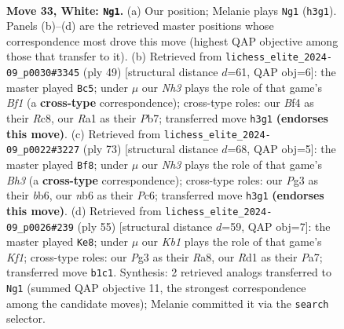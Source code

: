 \documentclass[11pt]{article}
\begin{document}
\clearpage

\begin{figure}[p]\centering
\begin{subfigure}{0.46\textwidth}\centering
\resizebox{\linewidth}{!}{%
\newchessgame
\chessboard[
  setfen={5r2/r7/pnB1bkp1/p4p1p/5B2/P4PPN/1P5P/RK1R4 w - - 2 33},
  showmover=false,
  pgfstyle=straightmove, color=movearrow, markmove={h3-g1}
]}
\caption{}
\end{subfigure}\hfill
\begin{subfigure}{0.46\textwidth}\centering
\resizebox{\linewidth}{!}{%
\newchessgame
\chessboard[
  setfen={2r2bk1/1p3p1p/5np1/1N6/2p5/2P1B2P/PP3PP1/3R2K1 b - - 6 25},
  showmover=false,
  pgfstyle=straightmove, color=movearrow, markmove={f8-c5}
]}
\caption{}
\end{subfigure}
\\[4pt]
\begin{subfigure}{0.46\textwidth}\centering
\resizebox{\linewidth}{!}{%
\newchessgame
\chessboard[
  setfen={4r1k1/1p3p1p/pBp1b1pb/2P1P3/4PP2/5NP1/1P3K1P/3R4 b - - 2 37},
  showmover=false,
  pgfstyle=straightmove, color=movearrow, markmove={h6-f8}
]}
\caption{}
\end{subfigure}\hfill
\begin{subfigure}{0.46\textwidth}\centering
\resizebox{\linewidth}{!}{%
\newchessgame
\chessboard[
  setfen={r4k2/p3bp1p/1p1p2p1/n7/3P1P2/2P1K1P1/PB1N3P/4R3 b - - 3 28},
  showmover=false,
  pgfstyle=straightmove, color=movearrow, markmove={f8-e8}
]}
\caption{}
\end{subfigure}
\caption{\textbf{Move 33, White: \texttt{Ng1}.} (a) Our position; Melanie plays \texttt{Ng1} (\texttt{h3g1}). Panels (b)--(d) are the retrieved master positions whose correspondence most drove this move (highest QAP objective among those that transfer to it). (b) Retrieved from \texttt{lichess\_elite\_2024-09\_p0030\#3345} (ply 49) [structural distance $d$=61, QAP obj=6]: the master played \texttt{Bc5}; under $\mu$ our \emph{Nh3} plays the role of that game's \emph{Bf1} (a \textbf{cross-type} correspondence); cross-type roles: our \emph{B}f4 as their \emph{R}c8, our \emph{R}a1 as their \emph{P}b7; transferred move \texttt{h3g1} \textbf{(endorses this move)}. (c) Retrieved from \texttt{lichess\_elite\_2024-09\_p0022\#3227} (ply 73) [structural distance $d$=68, QAP obj=5]: the master played \texttt{Bf8}; under $\mu$ our \emph{Nh3} plays the role of that game's \emph{Bh3} (a \textbf{cross-type} correspondence); cross-type roles: our \emph{P}g3 as their \emph{b}b6, our \emph{n}b6 as their \emph{P}c6; transferred move \texttt{h3g1} \textbf{(endorses this move)}. (d) Retrieved from \texttt{lichess\_elite\_2024-09\_p0026\#239} (ply 55) [structural distance $d$=59, QAP obj=7]: the master played \texttt{Ke8}; under $\mu$ our \emph{Kb1} plays the role of that game's \emph{Kf1}; cross-type roles: our \emph{P}g3 as their \emph{R}a8, our \emph{R}d1 as their \emph{P}a7; transferred move \texttt{b1c1}. Synthesis: 2 retrieved analogs transferred to \texttt{Ng1} (summed QAP objective 11, the strongest correspondence among the candidate moves); Melanie committed it via the \texttt{search} selector.}
\label{fig:thought-m64}
\end{figure}
\end{document}
